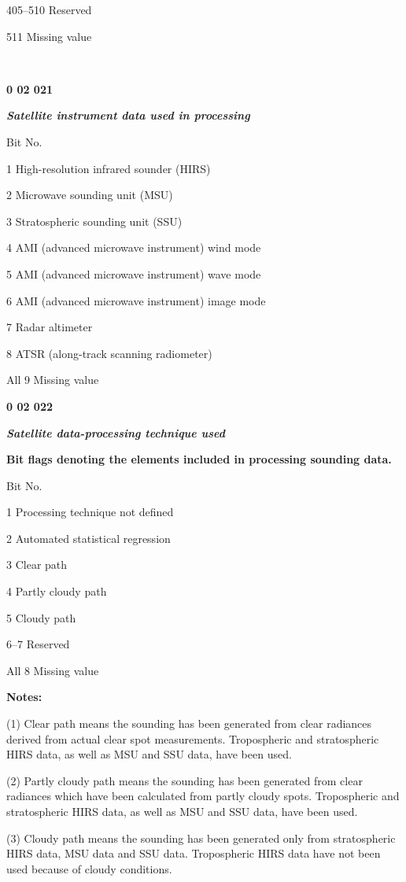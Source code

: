 405--510 Reserved

511 Missing value

\textbf{\\
}

\textbf{0 02 021}

\emph{\textbf{Satellite instrument data used in processing}}

Bit No.

1 High-resolution infrared sounder (HIRS)

2 Microwave sounding unit (MSU)

3 Stratospheric sounding unit (SSU)

4 AMI (advanced microwave instrument) wind mode

5 AMI (advanced microwave instrument) wave mode

6 AMI (advanced microwave instrument) image mode

7 Radar altimeter

8 ATSR (along-track scanning radiometer)

All 9 Missing value

\textbf{0 02 022}

\emph{\textbf{Satellite data-processing technique used}}

\textbf{Bit flags denoting the elements included in processing sounding data.}

Bit No.

1 Processing technique not defined

2 Automated statistical regression

3 Clear path

4 Partly cloudy path

5 Cloudy path

6--7 Reserved

All 8 Missing value

\textbf{Notes:}

(1) Clear path means the sounding has been generated from clear radiances derived from actual clear spot measurements. Tropospheric and stratospheric HIRS data, as well as MSU and SSU data, have been used.

(2) Partly cloudy path means the sounding has been generated from clear radiances which have been calculated from partly cloudy spots. Tropospheric and stratospheric HIRS data, as well as MSU and SSU data, have been used.

(3) Cloudy path means the sounding has been generated only from stratospheric HIRS data, MSU data and SSU data. Tropospheric HIRS data have not been used because of cloudy conditions.

